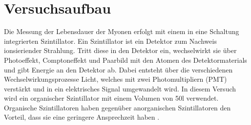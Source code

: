 \section{Versuchsaufbau}
Die Messung der Lebensdauer der Myonen erfolgt mit einem in eine Schaltung integrierten Szintillator.
Ein Szintillator ist ein Detektor zum Nachweis ionsieriender Strahlung. Tritt diese in den Detektor ein, 
wechselwirkt sie über Photoeffekt, Comptoneffekt und Paarbild mit den Atomen des Detektormaterials und gibt 
Energie an den Detektor ab. Dabei entsteht über die verschiedenen Wechselwirkungsprozesse Licht, welches 
mit zwei Photomultipliern (PMT) verstärkt und in ein elektrisches Signal umgewandelt wird.
In diesem Versuch wird ein organischer Szintillator mit einem Volumen von 50l verwendet. Organische Szintillatoren
haben gegenüber anorganischen Szintillatoren den Vorteil, dass sie eine geringere Ansprechzeit haben \cite{szintillatoren}.

